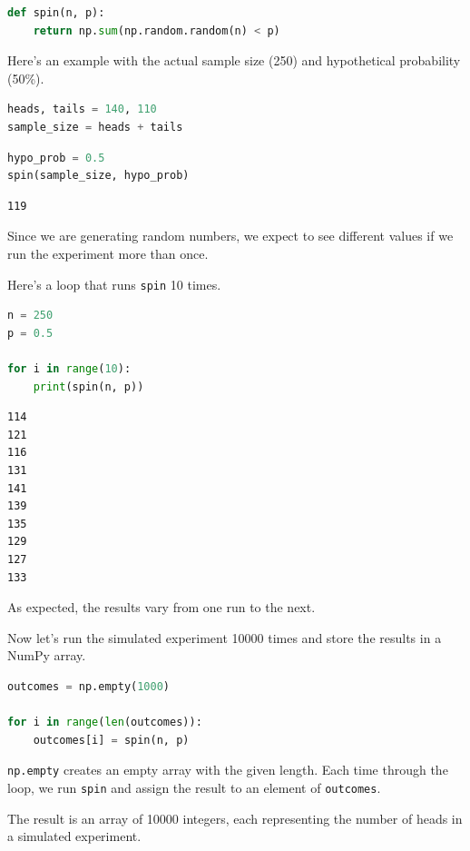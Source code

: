 \begin{lstlisting}[language=Python]
def spin(n, p):
    return np.sum(np.random.random(n) < p)
\end{lstlisting}

Here's an example with the actual sample size (250) and hypothetical
probability (50\%).

\begin{lstlisting}[language=Python]
heads, tails = 140, 110
sample_size = heads + tails
\end{lstlisting}

\begin{lstlisting}[language=Python]
hypo_prob = 0.5
spin(sample_size, hypo_prob)
\end{lstlisting}

\begin{lstlisting}[]
119
\end{lstlisting}

Since we are generating random numbers, we expect to see different
values if we run the experiment more than once.

Here's a loop that runs \passthrough{\lstinline!spin!} 10 times.

\begin{lstlisting}[language=Python]
n = 250
p = 0.5

for i in range(10):
    print(spin(n, p))
\end{lstlisting}

\begin{lstlisting}[]
114
121
116
131
141
139
135
129
127
133
\end{lstlisting}

As expected, the results vary from one run to the next.

Now let's run the simulated experiment 10000 times and store the results
in a NumPy array.

\begin{lstlisting}[language=Python]
outcomes = np.empty(1000)

for i in range(len(outcomes)):
    outcomes[i] = spin(n, p)
\end{lstlisting}

\passthrough{\lstinline!np.empty!} creates an empty array with the given
length. Each time through the loop, we run
\passthrough{\lstinline!spin!} and assign the result to an element of
\passthrough{\lstinline!outcomes!}.

The result is an array of 10000 integers, each representing the number
of heads in a simulated experiment.

